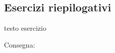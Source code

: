\subsection{Esercizi riepilogativi}

\begin{esercizio}
\label{ese:D.19}
testo esercizio
\end{esercizio}

\begin{esercizio}\label{ese:03.1}
Consegna:
 \begin{enumeratea}
  \item  
 \end{enumeratea}
\end{esercizio}
